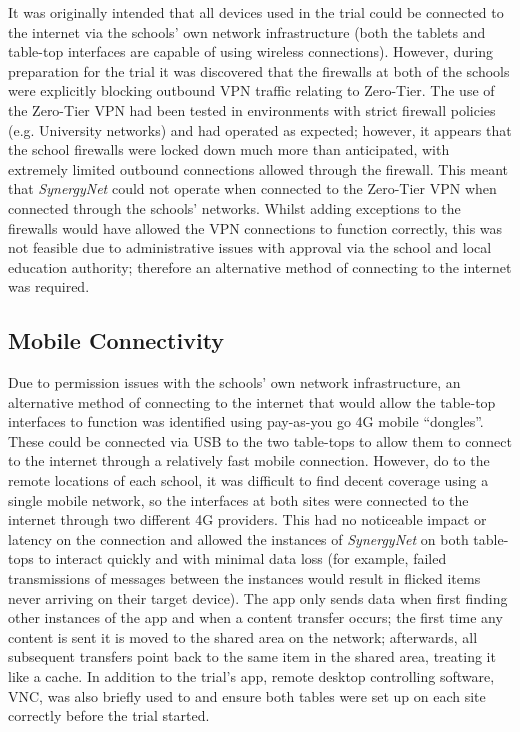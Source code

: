 \documentclass[a4paper,11pt]{article}
\begin{document}
It was originally intended that all devices used in the trial could be connected to the internet via the schools' own network infrastructure (both the tablets and table-top interfaces are capable of using wireless connections).
However, during preparation for the trial it was discovered that the firewalls at both of the schools were explicitly blocking outbound VPN traffic relating to Zero-Tier.
The use of the Zero-Tier VPN had been tested in environments with strict firewall policies (e.g. University networks) and had operated as expected; however, it appears that the school firewalls were locked down much more than anticipated, with extremely limited outbound connections allowed through the firewall.
This meant that {\emph{SynergyNet}} could not operate when connected to the Zero-Tier VPN when connected through the schools’ networks.
Whilst adding exceptions to the firewalls would have allowed the VPN connections to function correctly, this was not feasible due to administrative issues with approval via the school and local education authority; therefore an alternative method of connecting to the internet was required.

\subsection{Mobile Connectivity}

Due to permission issues with the schools' own network infrastructure, an alternative method of connecting to the internet that would allow the table-top interfaces to function was identified using pay-as-you go 4G mobile ``dongles''.
These could be connected via USB to the two table-tops to allow them to connect to the internet through a relatively fast mobile connection.
However, do to the remote locations of each school, it was difficult to find decent coverage using a single mobile network, so the interfaces at both sites were connected to the internet through two different 4G providers.
This had no noticeable impact or latency on the connection and allowed the instances of {\emph{SynergyNet}} on both table-tops to interact quickly and with minimal data loss (for example, failed transmissions of messages between the instances would result in flicked items never arriving on their target device).
The app only sends data when first finding other instances of the app and when a content transfer occurs; the first time any content is sent it is moved to the shared area on the network; afterwards, all subsequent transfers point back to the same item in the shared area, treating it like a cache.
In addition to the trial's app, remote desktop controlling software, VNC, was also briefly used to and ensure both tables were set up on each site correctly before the trial started.
\end{document}
